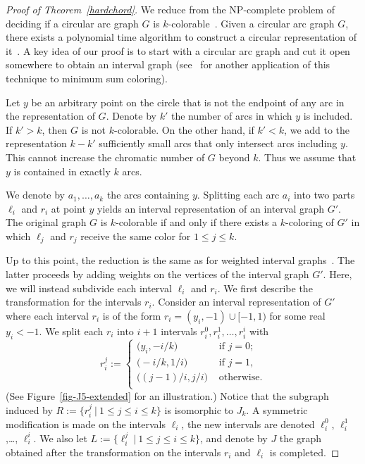 \documentclass[10pt,a4paper]{article}
\begin{document}
\begin{proof}[Proof of Theorem~\ref{hardchord}] 
We reduce from the NP-complete problem of deciding if a circular arc
graph $G$ is $k$-colorable~\cite{GJMP80}.
Given a circular arc graph $G$, there exists a polynomial time algorithm to construct a circular representation
of it~\cite{T80}. A key idea of our proof is to start with
a circular arc graph and cut it open somewhere to obtain an interval
graph (see~\cite{M05-orl} for another application of this technique to minimum sum coloring).

Let $y$ be an arbitrary point on the circle that is not the endpoint
of any arc in the representation of $G$. Denote by $k'$
the number of arcs in which $y$ is included. If $k'>k$, then $G$ is not
$k$-colorable. On the other hand, if $k'<k$, we add to the representation $k-k'$ sufficiently
small arcs that only intersect arcs including $y$. This cannot
increase the chromatic number of $G$ beyond $k$. Thus we assume 
that $y$ is contained in exactly $k$ arcs.

We denote by $a_1,\ldots, a_k$ the arcs containing $y$. Splitting each
arc $a_i$ into two parts $\ell_i$ and $r_i$ at point $y$ yields an interval
representation of an interval graph $G'$. The original graph $G$ is
$k$-colorable if and only if there exists a $k$-coloring of $G'$ in which
$\ell_j$ and $r_j$ receive the same color for $1 \leq j \leq k$.

Up to this point, the reduction is the same as for weighted interval graphs~\cite{CFJ07}.
The latter proceeds by adding weights on the vertices of the interval graph $G'$.
Here, we will instead subdivide each interval $\ell_i$ and $r_i$.
We first describe the transformation for the intervals $r_i$. 
Consider an interval representation of $G'$ where each interval $r_i$ is of the form 
$r_i = (y_i,-1) \cup [-1,1)$ for some real $y_i < -1$. We split each 
$r_i$ into $i+1$ intervals $r^0_i, r_i^1, 
\ldots ,r_i^i$ with 
$$
r_i^j := 
\begin{cases}
\big(y_i,-i/k \big) &\text{ if } j=0;\\
\big(-i/k, 1/i \big)  & \text{ if } j=1,\\
\big((j-1)/i, j/i \big) & \text{ otherwise}.\\   
\end{cases}
$$
(See Figure~\ref{fig-J5-extended} for an illustration.)
Notice that the subgraph induced by $R := \{r_i^j\ |\ 
1 \le j \le i \le k\}$ is isomorphic to $J_k$. 
A symmetric modification is made on the intervals $\ell_i$, 
the new intervals are denoted $\ell^0_i$, $\ell_i^1$ ,\ldots, $\ell_i^i$. 
We also let $L := \{\ell_i^j\ |\ 1 \le j \le i \le k\}$, and denote by $J$ the graph 
obtained after the transformation on the intervals $r_{i}$ and $\ell_{i}$ is completed.


\end{proof}
\end{document}

